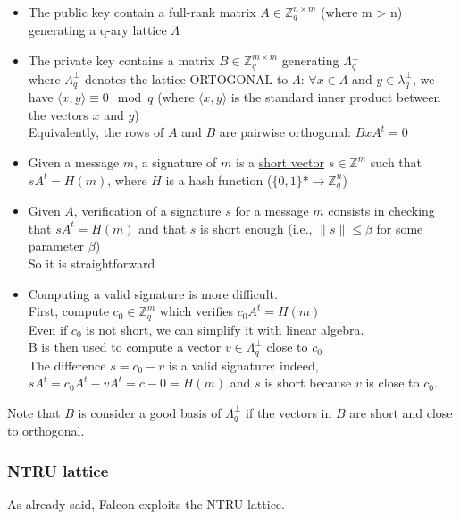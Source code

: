\begin{itemize}
    \item The public key contain a full-rank matrix $A \in \mathbb{Z}_q^{n \times m}$ (where m > n) generating a q-ary lattice $\Lambda$
    
    \item The private key contains a matrix $B \in \mathbb{Z}_q^{m \times m}$  generating $\Lambda_q^\bot$\\
    where $\Lambda_q^\bot$ denotes the lattice ORTOGONAL to $\Lambda$: $\forall x \in \Lambda$ and $ y \in \lambda_q^\bot$, we have $\langle x, y \rangle \equiv 0 \mod q$ (where $\langle x, y \rangle$ is the standard inner product between the vectors $x$ and $y$)\\
    Equivalently, the rows of $A$ and $B$ are pairwise orthogonal: $B x A^t = 0$

    \item Given a message $m$, a signature of $m$ is a \underline{short vector} $s \in \mathbb{Z}^m$ such that $sA^t = H(m)$, where $H$ is a hash function ($\{0, 1\}* \to \mathbb{Z}_q^n$)
    
    \item Given $A$, verification of a signature $s$ for a message $m$ consists in checking that $sA^t = H(m)$ and that $s$ is short enough (i.e., $\|s\| \leq \beta$ for some parameter $\beta$)\\
    So it is straightforward 

    \item Computing a valid signature is more difficult.\\
    First, compute $c_0 \in \mathbb{Z}_q^m$ which verifies $c_0 A^t = H(m)$\\
    Even if $c_0$ is not short, we can simplify it with linear algebra.\\
    B is then used to compute a vector $v \in \Lambda_q^\bot$ close to $c_0$\\
    The difference $s = c_0 - v$ is a valid signature: indeed, $s A^t = c_0A^t - v A^t = c - 0 = H(m)$ and $s$ is short because $v$ is close to $c_0$.

\end{itemize}

\noindent
Note that $B$ is consider a good basis of $\Lambda_q^\bot$ if the vectors in $B$ are short and close to orthogonal.

\subsubsection{NTRU lattice}
As already said, Falcon exploits the NTRU lattice.
\medskip


